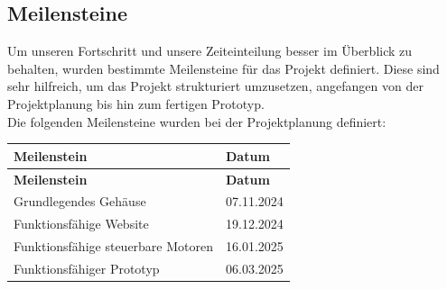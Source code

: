 \documentclass[ngerman,12pt,a4paper]{article}
\begin{document}
		\subsection{Meilensteine} %
		Um unseren Fortschritt und unsere Zeiteinteilung besser im Überblick zu behalten, wurden bestimmte Meilensteine für das Projekt definiert. Diese sind sehr hilfreich, um das Projekt strukturiert umzusetzen, angefangen von der Projektplanung bis hin zum fertigen Prototyp. \\[0.5cm]
		Die folgenden Meilensteine wurden bei der Projektplanung definiert:
		\begin{longtable}{| l | l |}
			\hline
			\textbf{Meilenstein} & \textbf{Datum} \\
			\hline
			\endfirsthead
			\hline
			\textbf{Meilenstein} & \textbf{Datum} \\
			\hline
			\endhead
			\hline
			Grundlegendes Gehäuse & 07.11.2024 \\
			\hline
			Funktionsfähige Website & 19.12.2024 \\
			\hline
			Funktionsfähige steuerbare Motoren & 16.01.2025 \\
			\hline
			Funktionsfähiger Prototyp & 06.03.2025 \\
			\hline
		\end{longtable}
\end{document}
